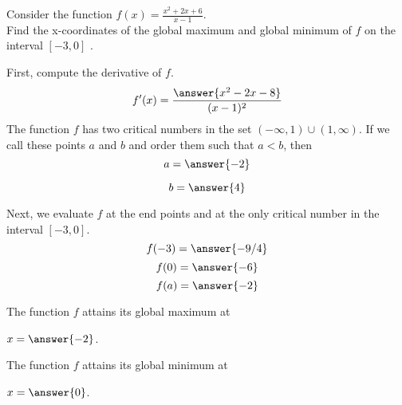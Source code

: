 \documentclass{ximera}
\author{Steven Gubkin \and Nela Lakos}
\begin{document}
\begin{exercise}

Consider the function $f(x) =\frac{x^2+2x+6}{x-1}$. \\
Find the x-coordinates of the global maximum and global minimum of $f$ on the interval $ [-3,0]$ .
\begin{hint}
First, compute the derivative of $f$.
$$
f'(x) = \frac{\answer{x^2-2x-8}}{(x-1)^2}
$$
The function $f$ has two critical numbers in the set $(-\infty,1)\cup (1,\infty)$. 
 If we call these points $a$ and $b$ and order them such
that $a < b $, then
$$
a = \answer{-2}
$$

$$
b=\answer{4}
$$
\end {hint}

\begin{hint}

Next, we evaluate $f$ at the end points and at  the only critical number in the interval $ [-3,0]$.
$$
f(-3) = \answer{-9/4}
$$
$$
f(0)=\answer{-6}
$$
$$
f(a)=\answer{-2}
$$
\end {hint}

The function $f$ attains its global maximum at	
\begin{prompt}
$x=\answer{-2}$.
\end{prompt}
The function $f$ attains its global minimum at	
\begin{prompt}
$x=\answer{0}$.
\end{prompt}
\end{exercise}
\end{document}
